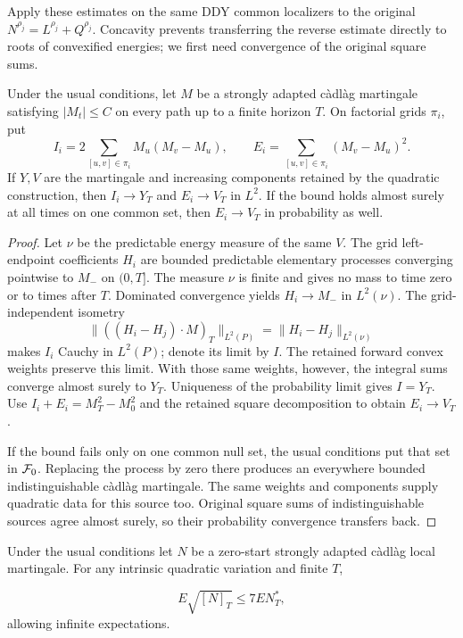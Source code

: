 Apply these estimates on the same DDY common localizers to the original
$N^{\rho_j}=L^{\rho_j}+Q^{\rho_j}$. Concavity prevents transferring the
reverse estimate directly to roots of convexified energies; we first need
convergence of the original square sums.
\begin{lemma}
Under the usual conditions, let $M$ be a strongly adapted c\`adl\`ag
martingale satisfying $|M_t|\leq C$ on every path up to a finite horizon $T$.
On factorial grids $\pi_i$, put
\[
 I_i=2\sum_{[u,v]\in\pi_i}M_u(M_v-M_u),\qquad
 E_i=\sum_{[u,v]\in\pi_i}(M_v-M_u)^2.
\]
If $Y,V$ are the martingale and increasing components retained by the
quadratic construction, then $I_i\to Y_T$ and $E_i\to V_T$ in $L^2$.
If the bound holds almost surely at all times on one common set, then
$E_i\to V_T$ in probability as well.
\end{lemma}
\begin{proof}
Let $\nu$ be the predictable energy measure of the same $V$.
The grid left-endpoint coefficients $H_i$ are bounded predictable elementary
processes converging pointwise to $M_-$ on $(0,T]$. The measure $\nu$ is
finite and gives no mass to time zero or to times after $T$.
Dominated convergence yields $H_i\to M_-$ in $L^2(\nu)$.
The grid-independent isometry
\[
 \|((H_i-H_j)\cdot M)_T\|_{L^2(P)}
 =\|H_i-H_j\|_{L^2(\nu)}
\]
makes $I_i$ Cauchy in $L^2(P)$; denote its limit by $I$.
The retained forward convex weights preserve this limit. With those same
weights, however, the integral sums converge almost surely to $Y_T$.
Uniqueness of the probability limit gives $I=Y_T$.
Use $I_i+E_i=M_T^2-M_0^2$ and the retained square decomposition to obtain
$E_i\to V_T$.

If the bound fails only on one common null set, the usual conditions put
that set in $\mathcal F_0$. Replacing the process by zero there produces an
everywhere bounded indistinguishable c\`adl\`ag martingale.
The same weights and components supply quadratic data for this source too.
Original square sums of indistinguishable sources agree almost surely,
so their probability convergence transfers back.
\end{proof}
\begin{theorem}
Under the usual conditions let $N$ be a zero-start strongly adapted
c\`adl\`ag local martingale. For any intrinsic quadratic variation and finite $T$,

\[
 E\sqrt{[N]_T}\leq7E N_T^*,
\] allowing infinite expectations.
\end{theorem}
